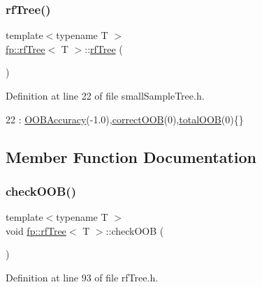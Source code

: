 \subsubsection{\texorpdfstring{rf\+Tree()}{rfTree()}\hspace{0.1cm}{\footnotesize\ttfamily [2/2]}}
{\footnotesize\ttfamily template$<$typename T $>$ \\
\hyperlink{classfp_1_1rfTree}{fp\+::rf\+Tree}$<$ T $>$\+::\hyperlink{classfp_1_1rfTree}{rf\+Tree} (\begin{DoxyParamCaption}{ }\end{DoxyParamCaption})\hspace{0.3cm}{\ttfamily [inline]}}



Definition at line 22 of file small\+Sample\+Tree.\+h.


\begin{DoxyCode}
22 : \hyperlink{classfp_1_1rfTree_a673f85d4df6f292a1819351c092a07e1}{OOBAccuracy}(-1.0),\hyperlink{classfp_1_1rfTree_a83832650bcea8d63cdcd480d9ddc6e6e}{correctOOB}(0),\hyperlink{classfp_1_1rfTree_aa200dc228adc20c12e514364d2b674df}{totalOOB}(0)\{\}
\end{DoxyCode}


\subsection{Member Function Documentation}
\mbox{\label{classfp_1_1rfTree_a45e47b318c90a1359840ab6161f20ab1}} 
\subsubsection{\texorpdfstring{check\+O\+O\+B()}{checkOOB()}\hspace{0.1cm}{\footnotesize\ttfamily [1/2]}}
{\footnotesize\ttfamily template$<$typename T $>$ \\
void \hyperlink{classfp_1_1rfTree}{fp\+::rf\+Tree}$<$ T $>$\+::check\+O\+OB (\begin{DoxyParamCaption}{ }\end{DoxyParamCaption})\hspace{0.3cm}{\ttfamily [inline]}}



Definition at line 93 of file rf\+Tree.\+h.



